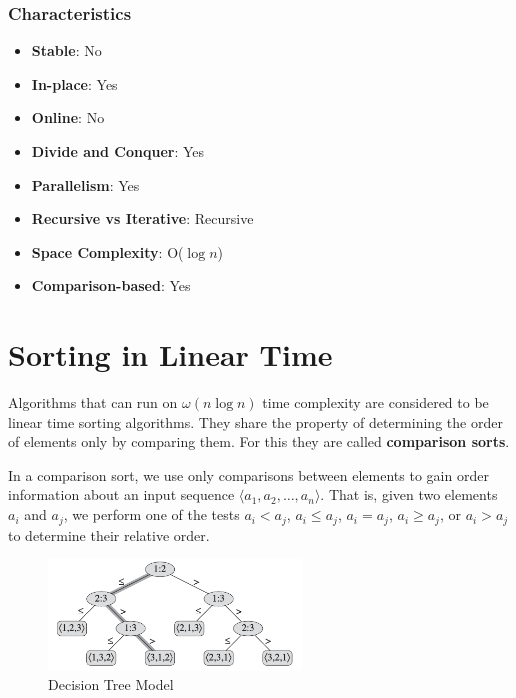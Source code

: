 \subsubsection*{Characteristics}

\begin{multicols}{2}
    \begin{itemize}
        \item \textbf{Stable}: No
        \item \textbf{In-place}: Yes
        \item \textbf{Online}: No
        \item \textbf{Divide and Conquer}: Yes
        \item \textbf{Parallelism}: Yes
        \item \textbf{Recursive vs Iterative}: Recursive
        \item \textbf{Space Complexity}: O($\log n$)
        \item \textbf{Comparison-based}: Yes
    \end{itemize}
\end{multicols}

\section{Sorting in Linear Time}

Algorithms that can run on $\omega(n \log n)$ time complexity are considered to be linear time sorting algorithms. They share the property of determining the order of elements only by comparing them. For this they are called \textbf{comparison sorts}.

In a comparison sort, we use only comparisons between elements to gain order 
information about an input sequence $\langle a_1, a_2, \dots, a_n \rangle$. That is, given two elements 
$a_i$ and $a_j$, we perform one of the tests $a_i < a_j$, $a_i \leq a_j$, $a_i = a_j$, 
$a_i \geq a_j$, or $a_i > a_j$ to determine their relative order.

\begin{figure}[H]
    \centering
    \includegraphics[width=0.6\textwidth]{assets/tree_model.png}
    \caption{Decision Tree Model \cite{cormen2022introduction}}
\end{figure}

